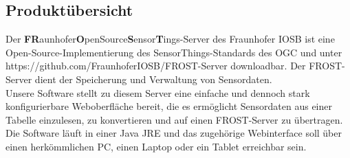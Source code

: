 \documentclass[12 pt]{article}
\begin{document}
	
	\subsection{Produktübersicht}
	
	Der \textbf{FR}aunhofer\textbf{O}penSource\textbf{S}ensor\textbf{T}ings-Server des Fraunhofer IOSB ist eine Open-Source-Implementierung des SensorThings-Standards des OGC und unter https://github.com/FraunhoferIOSB/FROST-Server downloadbar. Der FROST-Server dient der Speicherung und Verwaltung von Sensordaten.\\
	Unsere Software stellt zu diesem Server eine einfache und dennoch stark konfigurierbare Weboberfläche bereit, die es ermöglicht Sensordaten aus einer Tabelle einzulesen, zu konvertieren und auf einen FROST-Server zu übertragen. Die Software läuft in einer Java JRE und das zugehörige Webinterface soll über einen herkömmlichen PC, einen Laptop oder ein Tablet erreichbar sein.\\
	
	
\end{document}
